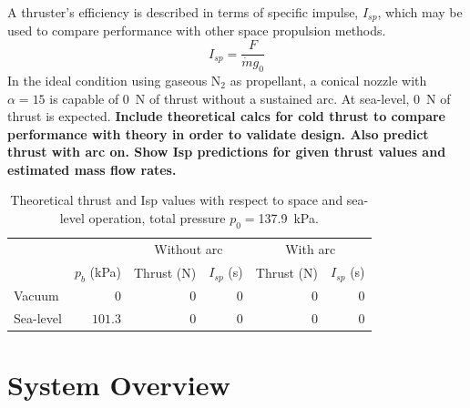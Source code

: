 \documentclass[journal]{IEEEtran}
\begin{document}
 A thruster's efficiency is described in terms of specific impulse, $I_{sp}$, which may be used to compare performance with other space propulsion methods.
 \begin{equation}
 \label{eq:isp}
   I_{sp}=\frac{F}{\dot{m} g_0}
 \end{equation}
In the ideal condition using gaseous N$_2$ as propellant, a conical nozzle with $\alpha=15$ is capable of \SI{0}{\newton} of thrust without a sustained arc.
At sea-level, \SI{0}{\newton} of thrust is expected.
\textbf{Include theoretical calcs for cold thrust to compare performance with theory in order to validate design.
Also predict thrust with arc on.
Show Isp predictions for given thrust values and estimated mass flow rates.}

\begin{table}[hbp]
  \caption{Theoretical thrust and Isp values with respect to space and sea-level operation, total pressure $p_0= $\SI{137.9}{\kilo\pascal}.
\label{tab:theoretical-performance}
}
  \begin{tabular}{lrrrrr}
    \toprule
    & & \multicolumn{2}{c}{Without arc} & \multicolumn{2}{c}{With arc} \\
    & $p_b$ (\si{\kilo\pascal}) & Thrust (\si{\newton}) & $I_{sp}$ (\si{\second}) & Thrust (\si{\newton}) & $I_{sp}$ (\si{\second}) \\
    \midrule
    Vacuum & $0$ & $0$ & $0$ & $0$ & $0$ \\
    Sea-level & $101.3$ & $0$ & $0$ & $0$ & $0$  \\
    \bottomrule
  \end{tabular}
\end{table}

\section{System Overview}
\end{document}
